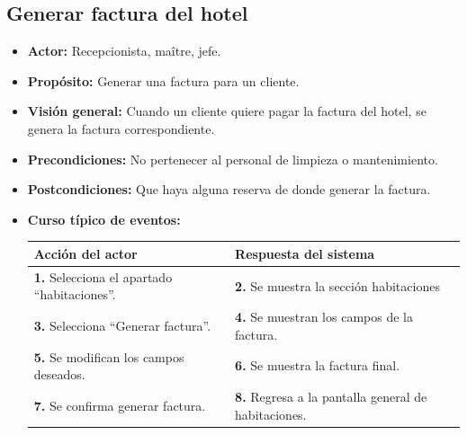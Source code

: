 \documentclass[spanish,a4paper,11pt, twoside]{report}	%
\begin{document}
	\subsection{Generar factura del hotel}
		\begin{itemize}
			\item \textbf{Actor:} Recepcionista, maître, jefe.
			\item \textbf{Propósito:} Generar una factura para un cliente.
			\item \textbf{Visión general:} Cuando un cliente quiere pagar la factura del
					hotel, se genera la factura correspondiente.
			\item \textbf{Precondiciones:} No pertenecer al personal de limpieza o
					mantenimiento.
			\item \textbf{Postcondiciones:} Que haya alguna reserva de donde generar la
				factura.
				\item \textbf{Curso típico de eventos:}  \\
				\begin{tabular}{|p{6cm}||p{6cm}|}
				\hline
				\textbf{Acción del actor} & \textbf{Respuesta del sistema} \\ \hline
				\textbf{1.} Selecciona el apartado ``habitaciones''. & 
				\textbf{2.} Se muestra la sección habitaciones \\ \hline 
				\textbf{3.} Selecciona ``Generar factura''. & 
				\textbf{4.} Se muestran los campos de la factura.  \\ \hline
				\textbf{5.} Se modifican los campos deseados. & 
				\textbf{6.} Se muestra la factura final. \\ \hline
				\textbf{7.} Se confirma generar factura. & 
				\textbf{8.} Regresa a la pantalla general de habitaciones.\\ \hline
			\end{tabular}
			\\
		\end {itemize}



	\hspace{0.6 true cm}
\end{document}
